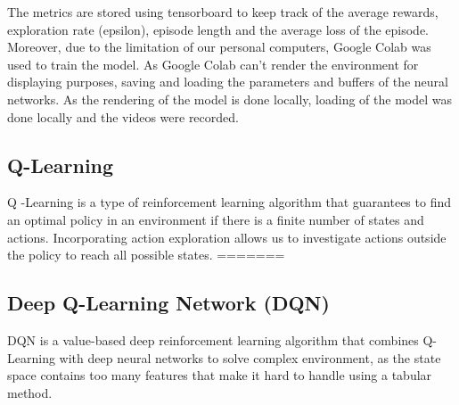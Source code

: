 \documentclass{article}
\begin{document}
The metrics are stored using tensorboard to keep track of the average rewards, exploration rate (epsilon), episode length and the average loss of the episode.
Moreover, due to the limitation of our personal computers, Google Colab was used to train the model.
As Google Colab can't render the environment for displaying purposes, saving and loading the parameters and buffers of the neural networks.
As the rendering of the model is done locally, loading of the model was done locally and the videos were recorded.


\subsection{Q-Learning}

Q -Learning is a type of reinforcement learning algorithm that guarantees to find an optimal policy in an environment if there is a finite number of states and actions. Incorporating action exploration allows us to investigate actions outside the policy to reach all possible states. 
=======



\subsection{Deep Q-Learning Network (DQN)}





DQN is a value-based deep reinforcement learning algorithm that combines Q-Learning with deep neural networks to solve complex environment, as the state space contains too many features that make it hard to handle using a tabular method.
\end{document}
